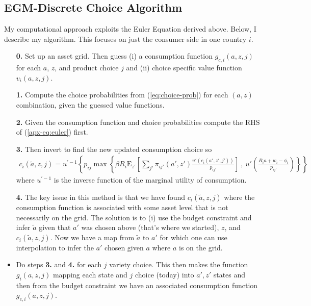 \documentclass[12pt,pdftex]{article}
\begin{document}
\begin{onehalfspacing}
\subsection{EGM-Discrete Choice Algorithm}

My computational approach exploits the Euler Equation derived above. Below, I describe my algorithm. This focuses on just the consumer side in one country $i$.
\begin{itemize}
\item[\textbf{0.}] Set up an asset grid. Then guess (i) a consumption function $g_{c,i}(a,z,j)$ for each $a$, $z$, and product choice $j$ and (ii) choice specific value function $v_{i}(a,z,j)$.

\item[\textbf{1.}] Compute the choice probabilities from (\ref{eq:choice-prob}) for each $(a,z)$ combination, given the guessed value functions.

\item[\textbf{2.}] Given the consumption function and choice probabilities compute the RHS of (\ref{apx-eq:euler}) first.

\item[\textbf{3.}] Then invert to find the new updated consumption choice so
\begin{align}
c_{i}(\tilde a, z, j) = u^{' -1}\left\{ p_{ij} \max \left\{ \beta R_{i} \mathrm{E}_{z'} \left[ \sum_{j'} \pi_{ij'}(a', z') \frac{u'(c_{i}(a', z',j'))}{p_{ij'}} \right] \ , \  u' \left( \frac{R_i a + w_i - \phi_{i}}{p_{ij'}} \right) \right \} \right \}
\end{align}
where $u^{' -1}$ is the inverse function of the marginal utility of consumption.

\item[\textbf{4.}] The key issue in this method is that we have found  $c_{i}(\tilde a, z, j)$ where the consumption function is associated with some asset level that is not necessarily on the grid. The solution is to (i) use the budget constraint and infer $\tilde a$ given that $a'$ was chosen above (that's where we started), $z$, and $c_{i}(\tilde a, z, j)$. Now we have a map from $\tilde a$ to $a'$ for which one can use interpolation to infer the $a'$ chosen given $a$ where $a$ is on the grid.

\item Do steps \textbf{3.} and \textbf{4.} for each $j$ variety choice. This then makes the function $g_{i}(a,z,j)$ mapping each state and $j$ choice (today) into $a', z'$ states and then from the budget constraint we have an associated consumption function $g_{c,i}(a,z,j)$.


\end{itemize}
\end{onehalfspacing}
\end{document}
